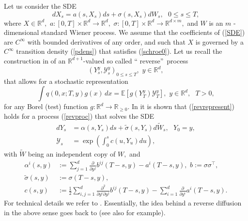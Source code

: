 \documentclass[a4paper,11pt]{amsart}
\theoremstyle{plain}
\theoremstyle{remark}
\begin{document}
Let us consider the SDE%
\begin{equation}
dX_{s}=a(s,X_{s})ds+\sigma(s,X_{s})dW_{s},\text{ \ \ }0\leq s\leq T,
\label{SDE}%
\end{equation}
where $X\in\mathbb{R}^{d},$ $a:\left[  0,T\right]  \times\mathbb{R}%
^{d}\rightarrow\mathbb{R}^{d},$ $\sigma:\left[  0,T\right]  \times
\mathbb{R}^{d}\rightarrow\mathbb{R}^{d\times m},$ and $W$ is an $m$%
-dimensional standard Wiener process. We assume that the coefficients of
(\ref{SDE}) are $C^{\infty}$ with bounded derivatives of any order, and such
that $X$ is governed by a $C^{\infty}$ transition density (\ref{pdens}) that
satisfies (\ref{schroe0}). Let us recall the construction in \cite{MSS2004} of
an $\mathbb{R}^{d+1}$-valued so called \textquotedblleft
reverse\textquotedblright\ process
\begin{equation}
\left(  Y_{s}^{y},\mathcal{Y}_{s}^{y}\right)  _{0\leq s\leq T},\text{
\ \ \ }y\in\mathbb{R}^{d}, \label{revproc}%
\end{equation}
that allows for a stochastic representation%
\begin{equation}
\int q(0,x;T,y)g(x)\,dx=\mathbb{E}[g(Y_{T}^{y})\mathcal{Y}_{T}^{y}],\text{
\ \ \ }y\in\mathbb{R}^{d},\text{ }T>0, \label{revrepresent}%
\end{equation}
for any Borel (test) function $g:\mathbb{R}^{d}\rightarrow\mathbb{R}_{\geq0}.$
In \cite{MSS2004} it is shown that (\ref{revrepresent}) holds for a process
(\ref{revproc}) that solves the SDE%
\begin{align}
dY_{s}  &  =\alpha\left(  s,Y_{s}\right)  ds+\widetilde{\sigma}\left(
s,Y_{s}\right)  d\widetilde{W}_{s},\text{ \ \ }Y_{0}=y,\nonumber\\
\mathcal{Y}_{s}  &  =\exp\left(  \int_{0}^{s}c(u,Y_{u})du\right)  ,
\label{Yrev}%
\end{align}
with $\widetilde{W}$ being an independent copy of $W,$ and%
\begin{align*}
\alpha^{i}\left(  s,y\right)   &  :=\sum_{j=1}^{d}\frac{\partial}{\partial
y^{j}}b^{ij}\left(  T-s,y\right)  -a^{i}\left(  T-s,y\right)  ,\text{
\ \ \ \ \ }b:=\sigma\sigma^{\top},\\
\widetilde{\sigma}\left(  s,y\right)   &  :=\sigma\left(  T-s,y\right)  ,\\
c(s,y)  &  :=\frac{1}{2}\sum_{i,j=1}^{d}\frac{\partial^{2}}{\partial
y^{i}\partial y^{j}}b^{ij}\left(  T-s,y\right)  -\sum_{i=1}^{d}\frac{\partial
}{\partial y^{i}}a^{i}\left(  T-s,y\right)  .
\end{align*}
For technical details we refer to \cite{MSS2004}. Essentially, the idea behind
a reverse diffusion in the above sense goes back to \cite{Thomson1987} (see
also \cite{KurSabRan} for example).
\end{document}
